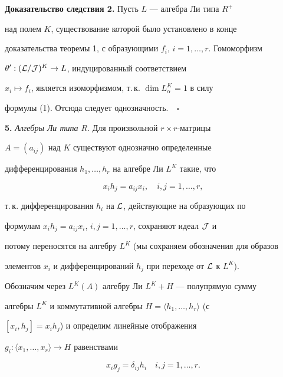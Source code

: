 {\bf Доказательство следствия 2.} Пусть $L$ --- алгебра Ли типа $R^+$


над полем $K$, существование которой было установлено в конце


доказательства теоремы 1, с образующими $f_i$, $i=1,\dotsc,r$. Гомоморфизм


$\theta':({\cal L/J})^K\to L$, индуцированный соответствием


$x_i\mapsto f_i$, является изоморфизмом, т.\,к. $\dim L_\alpha^K=1$ в силу


формулы (1). Отсюда следует однозначность.$\quad\square$


\medskip





{\bf 5.} {\it Алгебры Ли типа $R$}. Для произвольной $r\times r$-матрицы


$A=(a_{ij})$ над $K$ существуют однозначно определенные


дифференцирования $h_1,\dotsc,h_r$ на алгебре Ли $L^K$ такие, что


\begin{equation}


x_ih_j=a_{ij}x_i, \quad i,j=1,\dotsc,r,


\end{equation}


т.\,к. дифференцирования $h_i$ на $\cal L$, действующие на образующих по


формулам $x_ih_j=a_{ij}x_i$, $i,j=1,\dotsc,r$, сохраняют идеал $\cal J$ и


потому переносятся на алгебру $L^K$ (мы сохраняем обозначения для образов


элементов $x_i$ и дифференцирований $h_j$ при переходе от $\cal L$ к $L^K$).


Обозначим через $L^K(A)$ алгебру Ли $L^K+H$ --- полупрямую сумму


алгебры $L^K$ и коммутативной алгебры $H=\langle h_1,\dotsc,h_r\rangle$ (с


$[x_i,h_j]=x_ih_j$) и определим линейные отображения


$g_i:\langle x_1,\dotsc,x_r\rangle\to H$ равенствами


\begin{equation}


x_ig_j=\delta_{ij}h_i\quad i,j=1,\dotsc,r.


\end{equation}





